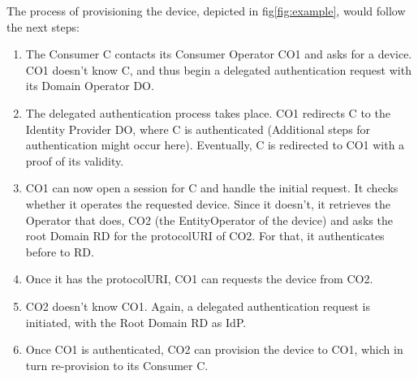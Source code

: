 The process of provisioning the device, depicted in fig\ref{fig:example}, would follow the next steps:
\begin{enumerate}
	\item The Consumer C contacts its Consumer Operator CO1 and asks for a device. CO1 doesn't know C, and thus begin a delegated authentication request with its Domain Operator DO. 
	\item The delegated authentication process takes place. CO1 redirects C to the Identity Provider DO, where C is authenticated (Additional steps for authentication might occur here). Eventually, C is redirected to CO1 with a proof of its validity.
	\item CO1 can now open a session for C and handle the initial request. It checks whether it operates the requested device. Since it doesn't, it retrieves the Operator that does, CO2 (the EntityOperator of the device) and asks the root Domain RD for the protocolURI of CO2. For that, it authenticates before to RD. 
	\item Once it has the protocolURI, CO1 can requests the device from CO2.
	\item CO2 doesn't know CO1. Again, a delegated authentication request is initiated, with the Root Domain RD as IdP.
	\item Once CO1 is authenticated, CO2 can provision the device to CO1, which in turn re-provision to its Consumer C.
\end{enumerate}


